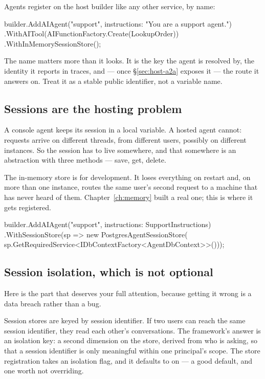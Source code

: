 Agents register on the host builder like any other service, by name:

\begin{csharp}[caption={Registering an agent}, label={lst:host-register}]
builder.AddAIAgent("support", instructions: "You are a support agent.")
       .WithAITool(AIFunctionFactory.Create(LookupOrder))
       .WithInMemorySessionStore();
\end{csharp}

The name matters more than it looks. It is the key the agent is resolved by, the
identity it reports in traces, and --- once \S\ref{sec:host-a2a} exposes it --- the
route it answers on. Treat it as a stable public identifier, not a variable name.

\subsection{Sessions are the hosting problem}

A console agent keeps its session in a local variable. A hosted agent cannot:
requests arrive on different threads, from different users, possibly on different
instances. So the session has to live somewhere, and that somewhere is an
abstraction with three methods --- save, get, delete.

The in-memory store is for development. It loses everything on restart and, on
more than one instance, routes the same user's second request to a machine that
has never heard of them. Chapter~\ref{ch:memory} built a real one; this is where
it gets registered.

\begin{csharp}[caption={A session store that survives}, label={lst:host-sessions}]
builder.AddAIAgent("support", instructions: SupportInstructions)
       .WithSessionStore(sp => new PostgresAgentSessionStore(
           sp.GetRequiredService<IDbContextFactory<AgentDbContext>>()));
\end{csharp}

\subsection{Session isolation, which is not optional}

Here is the part that deserves your full attention, because getting it wrong is a
data breach rather than a bug.

Session stores are keyed by session identifier. If two users can reach the same
session identifier, they read each other's conversations. The framework's answer
is an isolation key: a second dimension on the store, derived from who is asking,
so that a session identifier is only meaningful within one principal's scope. The
store registration takes an isolation flag, and it defaults to on --- a good
default, and one worth not overriding.

